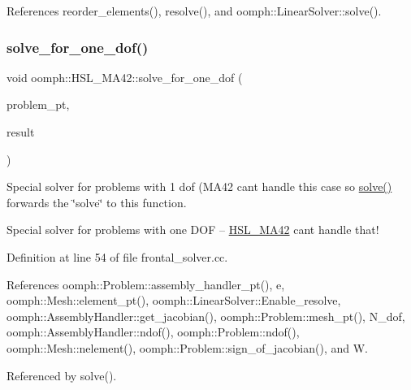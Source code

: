 References reorder\+\_\+elements(), resolve(), and oomph\+::\+Linear\+Solver\+::solve().

\mbox{\label{classoomph_1_1HSL__MA42_a79fca4aba6935fc5376cd9fa33a05f6a}} 
\subsubsection{\texorpdfstring{solve\+\_\+for\+\_\+one\+\_\+dof()}{solve\_for\_one\_dof()}}
{\footnotesize\ttfamily void oomph\+::\+H\+S\+L\+\_\+\+M\+A42\+::solve\+\_\+for\+\_\+one\+\_\+dof (\begin{DoxyParamCaption}\item[{\hyperlink{classoomph_1_1Problem}{Problem} $\ast$const \&}]{problem\+\_\+pt,  }\item[{\hyperlink{classoomph_1_1DoubleVector}{Double\+Vector} \&}]{result }\end{DoxyParamCaption})\hspace{0.3cm}{\ttfamily [private]}}



Special solver for problems with 1 dof (M\+A42 can\textquotesingle{}t handle this case so \hyperlink{classoomph_1_1HSL__MA42_ae796a6b14c13d1cdb7bf49ca3c7c5aec}{solve()} forwards the \char`\"{}solve\char`\"{} to this function. 

Special solver for problems with one D\+OF -- \hyperlink{classoomph_1_1HSL__MA42}{H\+S\+L\+\_\+\+M\+A42} can\textquotesingle{}t handle that! 

Definition at line 54 of file frontal\+\_\+solver.\+cc.



References oomph\+::\+Problem\+::assembly\+\_\+handler\+\_\+pt(), e, oomph\+::\+Mesh\+::element\+\_\+pt(), oomph\+::\+Linear\+Solver\+::\+Enable\+\_\+resolve, oomph\+::\+Assembly\+Handler\+::get\+\_\+jacobian(), oomph\+::\+Problem\+::mesh\+\_\+pt(), N\+\_\+dof, oomph\+::\+Assembly\+Handler\+::ndof(), oomph\+::\+Problem\+::ndof(), oomph\+::\+Mesh\+::nelement(), oomph\+::\+Problem\+::sign\+\_\+of\+\_\+jacobian(), and W.



Referenced by solve().



